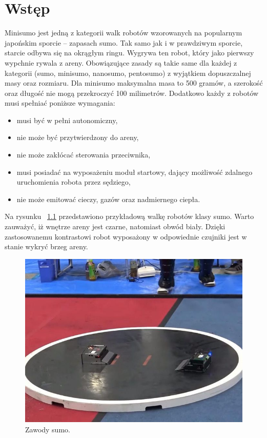 \chapter{Wstęp}
Minisumo jest jedną z kategorii walk robotów wzorowanych na popularnym japońskim sporcie – zapasach sumo. Tak samo jak i w prawdziwym sporcie, starcie odbywa się na okrągłym ringu. Wygrywa ten robot, który jako pierwszy wypchnie rywala z areny. Obowiązujące zasady są takie same dla każdej z kategorii (sumo, minisumo, nanosumo, pentosumo) z wyjątkiem dopuszczalnej masy oraz rozmiaru. Dla minisumo maksymalna masa to 500 gramów, a szerokość oraz długość nie mogą przekroczyć 100 milimetrów. Dodatkowo każdy z robotów musi spełniać 
poniższe wymagania:
\begin{itemize}
\item musi być w pełni autonomiczny,
\item nie może być przytwierdzony do areny,
\item nie może zakłócać sterowania przeciwnika,
\item musi posiadać na wyposażeniu moduł startowy, dający możliwość zdalnego uruchomienia robota przez sędziego,
\item nie może emitować cieczy, gazów oraz nadmiernego ciepła.
\end{itemize}

Na rysunku ~\ref{fig:sumo_competitions} przedstawiono przykładową walkę robotów klasy sumo. Warto zauważyć, iż  wnętrze areny jest czarne, natomiast obwód biały. Dzięki zastosowanemu kontrastowi robot wyposażony w odpowiednie czujniki jest w stanie wykryć brzeg areny.

\begin{figure}[H]
	\centering
		\includegraphics[width=0.5\linewidth]{pic01/sumo_competitions.jpg}
	\caption{Zawody sumo.}
	\label{fig:sumo_competitions}	
\end{figure}

